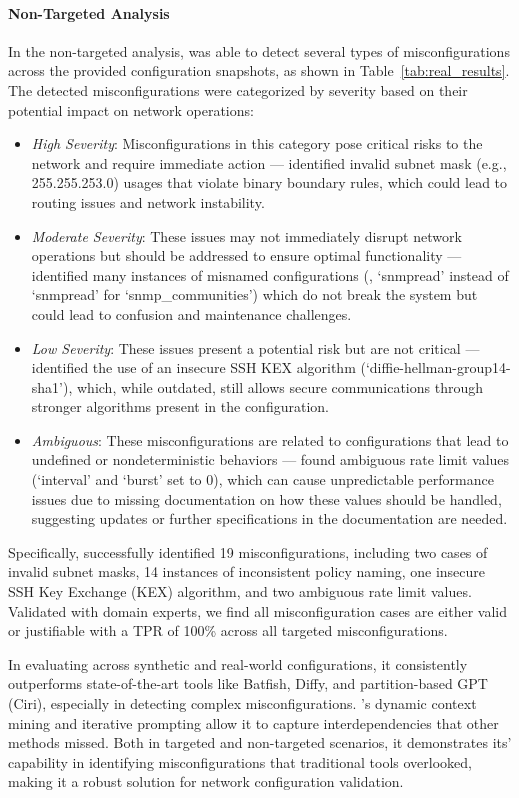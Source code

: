 \paragraph{Non-Targeted Analysis}
In the non-targeted analysis, \sysname{} was able to detect several types of misconfigurations across the provided configuration snapshots, as shown in Table~\ref{tab:real_results}.
The detected misconfigurations were categorized by severity based on their potential impact on network operations:
\begin{itemize}
    \item \textit{High Severity}: Misconfigurations in this category pose critical risks to the network and require immediate action --- \sysname{} identified invalid subnet mask (e.g., 255.255.253.0) usages that violate binary boundary rules, which could lead to routing issues and network instability.
    \item \textit{Moderate Severity}: These issues may not immediately disrupt network operations but should be addressed to ensure optimal functionality ---
    \sysname{} identified many instances of misnamed configurations (\eg, `snmpread' instead of `snmpread' for `snmp\_communities') which do not break the system but could lead to confusion and maintenance challenges.
    \item \textit{Low Severity}: These issues present a potential risk but are not critical ---  \sysname{} identified the use of an insecure SSH KEX algorithm (`diffie-hellman-group14-sha1'), which, while outdated, still allows secure communications through stronger algorithms present in the configuration.
    \item \textit{Ambiguous}: These misconfigurations are related to configurations that lead to undefined or nondeterministic behaviors --- \sysname{} found ambiguous rate limit values (`interval' and `burst' set to 0), which can cause unpredictable performance issues due to missing documentation on how these values should be handled, suggesting updates or further specifications in the documentation are needed.
\end{itemize}

Specifically, \sysname{} successfully identified 19 misconfigurations, including two cases of invalid subnet masks, 14 instances of inconsistent policy naming, one insecure SSH Key Exchange (KEX) algorithm, and two ambiguous rate limit values. Validated with domain experts, we find all misconfiguration cases are either valid or justifiable with a TPR of 100\% across all targeted misconfigurations.

In evaluating \sysname{} across synthetic and real-world configurations, it consistently outperforms state-of-the-art tools like Batfish, Diffy, and partition-based GPT (Ciri), especially in detecting complex misconfigurations. \sysname{}'s dynamic context mining and iterative prompting allow it to capture interdependencies that other methods missed. Both in targeted and non-targeted scenarios, it demonstrates its' capability in identifying misconfigurations that traditional tools overlooked, making it a robust solution for network configuration validation.